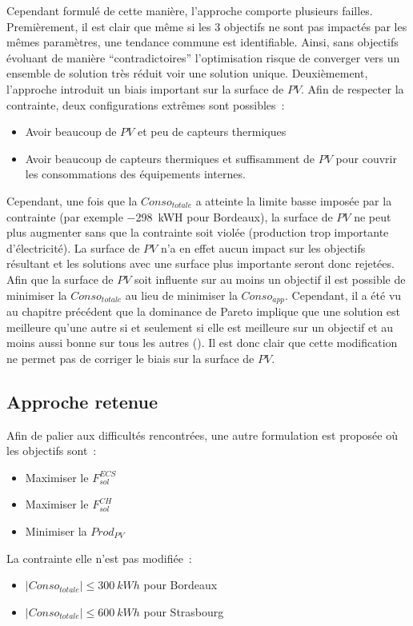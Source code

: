 Cependant formulé de cette manière, l’approche comporte plusieurs failles. Premièrement,
il est clair que même si les \num{3} objectifs ne sont pas impactés par les mêmes
paramètres, une tendance commune est identifiable. Ainsi, sans objectifs évoluant de
manière \enquote{contradictoires} l’optimisation risque de converger vers un ensemble
de solution très réduit voir une solution unique.
Deuxièmement, l’approche introduit un biais important sur la surface de $PV$. Afin de
respecter la contrainte, deux configurations extrêmes sont possibles~:
\begin{itemize}
  \item Avoir beaucoup de $PV$ et peu de capteurs thermiques
  \item Avoir beaucoup de capteurs thermiques et suffisamment de $PV$ pour couvrir
        les consommations des équipements internes.
\end{itemize}
Cependant, une fois que la $Conso_{totale}$
a atteinte la limite basse imposée par la contrainte (par exemple \SI{-298}{kWH} pour Bordeaux),
la surface de $PV$ ne peut plus augmenter sans que la contrainte soit violée (production trop importante d’électricité).
La surface de $PV$ n’a en effet aucun impact sur les objectifs résultant et les solutions avec
une surface plus importante seront donc rejetées.
Afin que la surface de $PV$ soit influente sur au moins un objectif il est possible
de minimiser la $Conso_{totale}$ au lieu de minimiser la $Conso_{app}$.
Cependant, il a été vu au chapitre précédent que la dominance de Pareto implique que une solution
est meilleure qu’une autre si et seulement si elle est meilleure sur un objectif et au moins
aussi bonne sur tous les autres (). Il est donc clair que
cette modification ne permet pas de corriger le biais sur la surface de $PV$.


\subsection{Approche retenue} %
\label{sub:approche_retenue}
\noindent Afin de palier aux difficultés rencontrées, une autre formulation est proposée où les objectifs
sont~:
\begin{itemize}
  \item Maximiser le $F_{sol}^{ECS}$
  \item Maximiser le $F_{sol}^{CH}$
  \item Minimiser la $Prod_{PV}$
\end{itemize}
La contrainte elle n’est pas modifiée~:
\begin{itemize}
   \item $|Conso_{totale}| \leq \SI{300}{kWh}$ pour Bordeaux
   \item $|Conso_{totale}| \leq \SI{600}{kWh}$ pour Strasbourg
\end{itemize}

